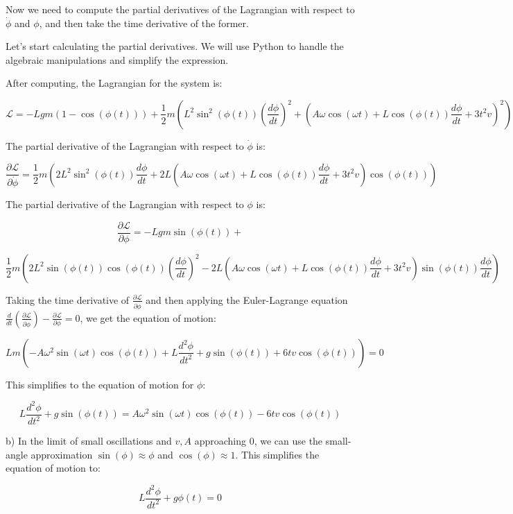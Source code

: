\documentclass[a4paper,11pt]{article}
\begin{document}
Now we need to compute the partial derivatives of the Lagrangian with respect to \( \dot{\phi} \) and \( \phi \), and then take the time derivative of the former.

Let's start calculating the partial derivatives. We will use Python to handle the algebraic manipulations and simplify the expression.

After computing, the Lagrangian for the system is:

\[ \mathcal{L} = -Lgm(1 - \cos(\phi(t))) + \frac{1}{2}m\left(L^2\sin^2(\phi(t))\left(\frac{d\phi}{dt}\right)^2 + \left(A\omega\cos(\omega t) + L\cos(\phi(t))\frac{d\phi}{dt} + 3t^2v\right)^2\right) \]

The partial derivative of the Lagrangian with respect to \( \dot{\phi} \) is:

\[ \frac{\partial \mathcal{L}}{\partial \dot{\phi}} = \frac{1}{2}m\left(2L^2\sin^2(\phi(t))\frac{d\phi}{dt} + 2L(A\omega\cos(\omega t) + L\cos(\phi(t))\frac{d\phi}{dt} + 3t^2v)\cos(\phi(t))\right) \]

The partial derivative of the Lagrangian with respect to \( \phi \) is:

\[ \frac{\partial \mathcal{L}}{\partial \phi} = -Lgm\sin(\phi(t)) + \]

\[ \frac{1}{2}m\left(2L^2\sin(\phi(t))\cos(\phi(t))\left(\frac{d\phi}{dt}\right)^2 - 2L(A\omega\cos(\omega t) + L\cos(\phi(t))\frac{d\phi}{dt} + 3t^2v)\sin(\phi(t))\frac{d\phi}{dt}\right) \]

Taking the time derivative of \( \frac{\partial \mathcal{L}}{\partial \dot{\phi}} \) and then applying the Euler-Lagrange equation \( \frac{d}{dt}\left(\frac{\partial \mathcal{L}}{\partial \dot{\phi}}\right) - \frac{\partial \mathcal{L}}{\partial \phi} = 0 \), we get the equation of motion:

\[ Lm\left(-A\omega^2\sin(\omega t)\cos(\phi(t)) + L\frac{d^2\phi}{dt^2} + g\sin(\phi(t)) + 6tv\cos(\phi(t))\right) = 0 \]

This simplifies to the equation of motion for \( \phi \):

\[ L\frac{d^2\phi}{dt^2} + g\sin(\phi(t)) = A\omega^2\sin(\omega t)\cos(\phi(t)) - 6tv\cos(\phi(t)) \]

b) In the limit of small oscillations and \( v, A \) approaching 0, we can use the small-angle approximation \( \sin(\phi) \approx \phi \) and \( \cos(\phi) \approx 1 \). This simplifies the equation of motion to:

\[ L\frac{d^2\phi}{dt^2} + g\phi(t) = 0 \]
\end{document}
